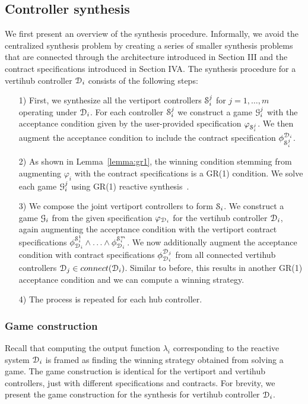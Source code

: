 \subsection{Controller synthesis}
We first present an overview of the synthesis procedure. Informally, we avoid the centralized synthesis problem by creating a series of smaller synthesis problems that are connected through the architecture introduced in Section III and the contract specifications introduced in Section IVA.
The synthesis procedure for a vertihub controller $\mathcal{D}_i$ consists of the following steps:
\begin{itemize}
 \item[1)] First, we synthesize all the vertiport controllers $\mathcal{S}_i^j$ for $j=1,\ldots,m$ operating under $\mathcal{D}_i$. For each controller $\mathcal{S}_i^j$ we construct a game $\mathcal{G}_{i}^j$ with the acceptance condition given by the user-provided specification $\varphi_{\mathcal{S}_i^j}$. We then augment the acceptance condition to include the contract specification $\phi_{\mathcal{S}_i^j}^{\mathcal{D}_i}$. 
  \item[2)] As shown in Lemma~\ref{lemma:gr1}, the winning condition stemming from augmenting $\varphi_i$ with the contract specifications is a GR(1) condition. We solve each game $\mathcal{G}_{i}^j$ using GR(1) reactive synthesis~\cite{bloem2012}. 
  \item[3)] We compose the joint vertiport controllers to form $\mathcal{S}_i$. We construct a game $\mathcal{G}_{i}$ from the given specification $\varphi_{\mathcal{D}_i}$ for the vertihub controller $\mathcal{D}_i$, again augmenting the acceptance condition with the vertiport contract specifications $\phi^{\mathcal{S}_i^1}_{\mathcal{D}_i} \wedge \ldots \wedge \phi^{\mathcal{S}_i^m}_{\mathcal{D}_i}$. We now additionally augment the acceptance condition with contract specifications $\phi_{\mathcal{D}_i}^{\mathcal{D}_j}$ from all connected vertihub controllers $\mathcal{D}_j \in connect(\mathcal{D}_i)$. Similar to before, this results in another GR(1) acceptance condition and we can compute a winning strategy. 
\item[4)] The process is repeated for each hub controller.
\end{itemize}



\subsubsection{Game construction}
Recall that computing the output function $\lambda_i$ corresponding to the reactive system $\mathcal{D}_i$ is framed as finding the winning strategy obtained from solving a game. The game construction is identical for the vertiport and vertihub controllers, just with different specifications and contracts. For brevity, we present the game construction for the synthesis for vertihub controller $\mathcal{D}_i$.

